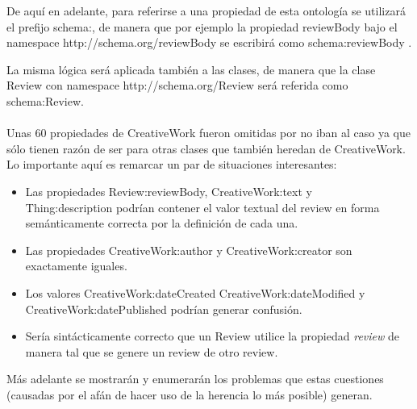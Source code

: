 \noindent De aquí en adelante, para referirse a una propiedad de esta ontología se utilizará el prefijo schema:, de manera que por ejemplo
la propiedad reviewBody bajo el namespace http://schema.org/reviewBody se escribirá como schema:reviewBody .

La misma lógica será aplicada también a las clases, de manera que la clase Review con namespace http://schema.org/Review será
referida como schema:Review.
\\\\
Unas 60 propiedades de CreativeWork fueron omitidas por no iban al caso ya que sólo tienen razón de ser para otras clases que 
también heredan de CreativeWork. Lo importante aquí es remarcar un par de situaciones interesantes:

\begin{itemize}
 \item Las propiedades Review:reviewBody, CreativeWork:text y \\\noindent Thing:description podrían contener el valor textual del review en forma semánticamente correcta por la definición de cada una.

 \item Las propiedades CreativeWork:author y CreativeWork:creator son exactamente iguales. 

 \item Los valores CreativeWork:dateCreated CreativeWork:dateModified y CreativeWork:datePublished podrían generar confusión. 

 \item Sería sintácticamente correcto que un Review utilice la propiedad \textit{review} de manera tal que se genere un review de otro review.
\end{itemize}

Más adelante se mostrarán y enumerarán los problemas que estas cuestiones (causadas por el afán de hacer uso de la herencia
lo más posible) generan. 